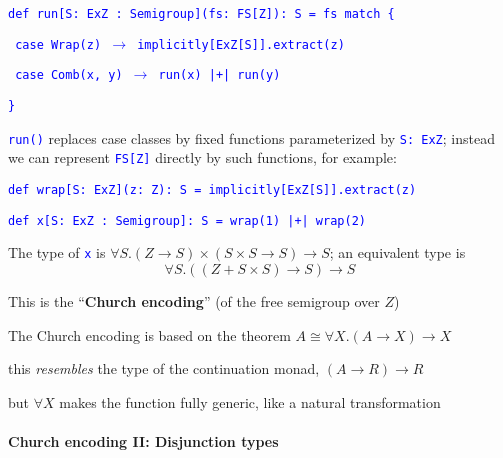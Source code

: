 \texttt{\textcolor{blue}{\footnotesize{}def run{[}S: ExZ : Semigroup{]}(fs: FS{[}Z{]}): S
= fs match \{}}{\footnotesize\par}

\texttt{\textcolor{blue}{\footnotesize{}  case Wrap(z) $\rightarrow$
implicitly{[}ExZ{[}S{]}{]}.extract(z)}}{\footnotesize\par}

\texttt{\textcolor{blue}{\footnotesize{}  case Comb(x, y) $\rightarrow$
run(x) |+| run(y)}}{\footnotesize\par}

\texttt{\textcolor{blue}{\footnotesize{}\}}}{\footnotesize\par}

\texttt{\textcolor{blue}{\footnotesize{}run()}} replaces case classes
by fixed functions parameterized by \texttt{\textcolor{blue}{\footnotesize{}S:~ExZ}};
instead we can represent \texttt{\textcolor{blue}{\footnotesize{}FS{[}Z{]}}}
directly by such functions, for example:

\texttt{\textcolor{blue}{\footnotesize{}def wrap{[}S: ExZ{]}(z: Z): S
= implicitly{[}ExZ{[}S{]}{]}.extract(z)}}{\footnotesize\par}

\texttt{\textcolor{blue}{\footnotesize{}def x{[}S: ExZ : Semigroup{]}: S
= wrap(1) |+| wrap(2)}}{\footnotesize\par}

The type of \texttt{\textcolor{blue}{\footnotesize{}x}} is {\footnotesize{}$\forall S.\left(Z\rightarrow S\right)\times\left(S\times S\rightarrow S\right)\rightarrow S$};
an equivalent type is{\footnotesize{}
\[
\forall S.\left(\left(Z+S\times S\right)\rightarrow S\right)\rightarrow S
\]
}{\footnotesize\par}

This is the \textsf{``}\textbf{Church encoding}\textsf{''} (of the free semigroup
over $Z$)

The Church encoding is based on the theorem {\footnotesize{}$A\cong\forall X.\left(A\rightarrow X\right)\rightarrow X$} 

this \emph{resembles} the type of the continuation monad, $\left(A\rightarrow R\right)\rightarrow R$ 

but $\forall X$ makes the function fully generic, like a natural
transformation


\paragraph{Church encoding II: Disjunction types}

